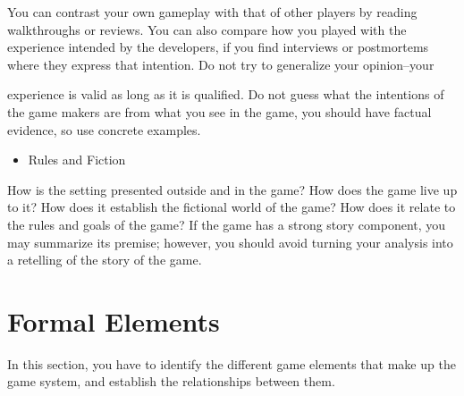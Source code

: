 \documentclass[
]{book}
\providecommand{\tightlist}{%
  \setlength{\itemsep}{0pt}\setlength{\parskip}{0pt}}
\begin{document}
You can contrast your own gameplay with that of other players by reading
walkthroughs or reviews. You can also compare how you played with the
experience intended by the developers, if you find interviews or postmortems
where they express that intention. Do not try to generalize your opinion--your

experience is valid as long as it is qualified. Do not guess what the intentions of
the game makers are from what you see in the game, you should have factual
evidence, so use concrete examples.

\begin{itemize}
\tightlist
\item
  Rules and Fiction
\end{itemize}

How is the setting presented outside and in the game? How does the game live up
to it? How does it establish the fictional world of the game? How does it relate to
the rules and goals of the game? If the game has a strong story component, you
may summarize its premise; however, you should avoid turning your analysis
into a retelling of the story of the game.

\hypertarget{formal-elements}{%
\section{Formal Elements}\label{formal-elements}}

In this section, you have to identify the different game elements that make up the
game system, and establish the relationships between them.
\end{document}

